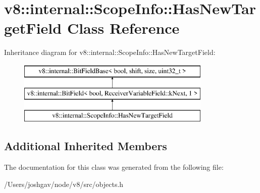 \hypertarget{classv8_1_1internal_1_1_scope_info_1_1_has_new_target_field}{}\section{v8\+:\+:internal\+:\+:Scope\+Info\+:\+:Has\+New\+Target\+Field Class Reference}
\label{classv8_1_1internal_1_1_scope_info_1_1_has_new_target_field}
Inheritance diagram for v8\+:\+:internal\+:\+:Scope\+Info\+:\+:Has\+New\+Target\+Field\+:\begin{figure}[H]
\begin{center}
\leavevmode
\includegraphics[height=3.000000cm]{classv8_1_1internal_1_1_scope_info_1_1_has_new_target_field}
\end{center}
\end{figure}
\subsection*{Additional Inherited Members}


The documentation for this class was generated from the following file\+:\begin{DoxyCompactItemize}
\item 
/\+Users/joshgav/node/v8/src/objects.\+h\end{DoxyCompactItemize}
